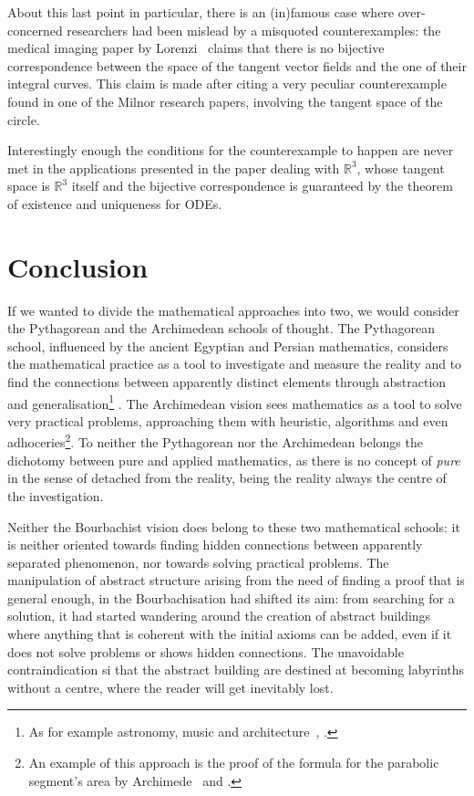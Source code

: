 \documentclass[]{scrartcl}
\theoremstyle{definition}
\begin{document}
About this last point in particular, there is an (in)famous case where over-concerned researchers had been mislead by a misquoted counterexamples: the medical imaging paper by Lorenzi~\cite{lorenzi2013geodesics} claims that there is no bijective correspondence between the space of the tangent vector fields and the one of their integral curves. This claim is made after citing a very peculiar counterexample found in one of the Milnor research papers, involving the tangent space of the circle.

Interestingly enough the conditions for the counterexample to happen are never met in the applications presented in the paper dealing with $\mathbb{R}^3$, whose tangent space is $\mathbb{R}^3$ itself and the bijective correspondence is guaranteed by the theorem of existence and uniqueness for ODEs.


\section{Conclusion}

If we wanted to divide the mathematical approaches into two, we would consider the Pythagorean and the Archimedean schools of thought. The Pythagorean school, influenced by the ancient Egyptian and Persian mathematics, considers the mathematical practice as a tool to investigate and measure the reality and to find the connections between apparently distinct elements through abstraction and generalisation\footnote{
    As for example astronomy, music and architecture~\cite{robins1995mathematics}, \cite{boyer2011history}.
}
. The Archimedean vision sees mathematics as a tool to solve very practical problems, approaching them with heuristic, algorithms and even adhoceries\footnote{
    An example of this approach is the proof of the formula for the parabolic segment's area by Archimede~\cite{boyer2011history} and \cite{strogatz2019infinite}.
}. To neither the Pythagorean nor the Archimedean belongs the dichotomy between pure and applied mathematics, as there is no concept of \emph{pure} in the sense of detached from the reality, being the reality always the centre of the investigation.

Neither the Bourbachist vision does belong to these two mathematical schools: it is neither oriented towards finding hidden connections between apparently separated phenomenon, nor towards solving practical problems. The manipulation of abstract structure arising from the need of finding a proof that is general enough, in the Bourbachisation had shifted its aim: from searching for a solution, it had started wandering around the creation of abstract buildings where anything that is coherent with the initial axioms can be added, even if it does not solve problems or shows hidden connections. The unavoidable contraindication si that the abstract building are destined at becoming labyrinths without a centre, where the reader will get inevitably lost.
\end{document}
